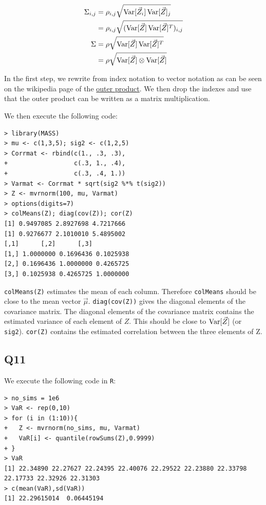\begin{align*}
\Sigma_{i,j} & = \rho_{i,j} \sqrt{\operatorname{\text{Var}}[\vec{Z}_i]\operatorname{\text{Var}}[\vec{Z}]_j} \\
             & = \rho_{i,j} \sqrt{(\operatorname{\text{Var}}[\vec{Z}]\operatorname{\text{Var}}[\vec{Z}]^{T})_{i,j}} \\
\Sigma       & = \rho \sqrt{\operatorname{\text{Var}}[\vec{Z}]\operatorname{\text{Var}}[\vec{Z}]^{T}} \\
             & = \rho \sqrt{\operatorname{\text{Var}}[\vec{Z}] \otimes \operatorname{\text{Var}}[\vec{Z}]}
\end{align*}

In the first step, we rewrite from index notation to vector notation as can be seen on the wikipedia page of the \href{https://en.wikipedia.org/wiki/Outer_product}{outer product}. We then drop the indexes and use that the outer product can be written as a matrix multiplication.

We then execute the following code:

\begin{verbatim}
> library(MASS)
> mu <- c(1,3,5); sig2 <- c(1,2,5)
> Corrmat <- rbind(c(1., .3, .3),
+                  c(.3, 1., .4),
+                  c(.3, .4, 1.))
> Varmat <- Corrmat * sqrt(sig2 %*% t(sig2))
> Z <- mvrnorm(100, mu, Varmat)
> options(digits=7)
> colMeans(Z); diag(cov(Z)); cor(Z)
[1] 0.9497085 2.8927698 4.7217666
[1] 0.9276677 2.1010010 5.4895002
[,1]      [,2]      [,3]
[1,] 1.0000000 0.1696436 0.1025938
[2,] 0.1696436 1.0000000 0.4265725
[3,] 0.1025938 0.4265725 1.0000000
\end{verbatim}

\verb|colMeans(Z)| estimates the mean of each column. Therefore \verb|colMeans| should be close to the mean vector $\vec{\mu}$.
\verb|diag(cov(Z))| gives the diagonal elements of the covariance matrix. The diagonal elements of the covariance matrix contains the estimated variance of each element of $Z$. This should be close to $\operatorname{\text{Var}}[\vec{Z}]$ (or \verb|sig2|).
\verb|cor(Z)| contains the estimated correlation between the three elements of Z.

\subsection*{Q11}

We execute the following code in \verb|R|:

\begin{verbatim}
> no_sims = 1e6
> VaR <- rep(0,10)
> for (i in (1:10)){
+   Z <- mvrnorm(no_sims, mu, Varmat)
+   VaR[i] <- quantile(rowSums(Z),0.9999)
+ }
> VaR
[1] 22.34890 22.27627 22.24395 22.40076 22.29522 22.23880 22.33798 22.17733 22.32926 22.31303
> c(mean(VaR),sd(VaR))
[1] 22.29615014  0.06445194
\end{verbatim}


